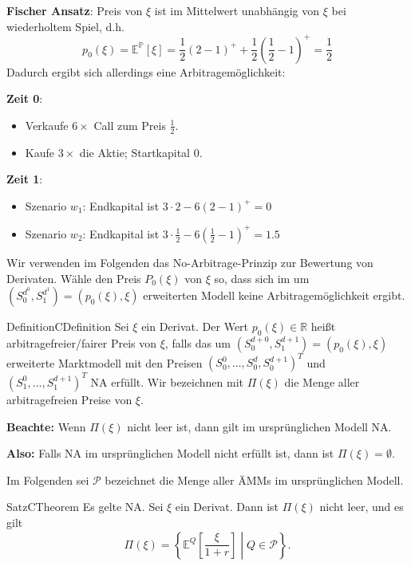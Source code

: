 \documentclass[11.5 pt, a4paper]{memoir}
\begin{document}
\textbf{Fischer Ansatz}: Preis von $\xi$ ist im Mittelwert unabhängig von $\xi$ bei wiederholtem Spiel, d.h.
\[
p_0(\xi) = \mathbb{E}^{ \mathbb{P} } \left[ \xi \right] = \frac{1}{2} \left(2 - 1\right)^+ + \frac{1}{2} \left(\frac{1}{2} - 1\right)^+ = \frac{1}{2}
\]
Dadurch ergibt sich allerdings eine Arbitragemöglichkeit:

\textbf{Zeit 0}:
\begin{itemize}
	\item Verkaufe $6 \times$ Call zum Preis $\frac{1}{2}$.
	\item Kaufe $3 \times$ die Aktie; Startkapital 0.
\end{itemize}
\textbf{Zeit 1}: 
\begin{itemize}
    \item Szenario $w_1$: Endkapital ist $3 \cdot 2 - 6 \left(2 - 1\right)^+ = 0$
    \item Szenario $w_2$: Endkapital ist $3 \cdot \frac{1}{2} - 6 \left(\frac{1}{2} - 1\right)^+ = 1.5$
\end{itemize}
Wir verwenden im Folgenden das No-Arbitrage-Prinzip zur Bewertung von Derivaten. Wähle den Preis $P_0(\xi)$ von $\xi$ so, dass sich im um $\left( S_0^{d^0}, S_1^{d^1} \right) = \left( p_0(\xi), \xi \right)$ erweiterten Modell keine Arbitragemöglichkeit ergibt.

\begin{ibox}[3.4]{Definition}{CDefinition}
Sei $\xi$ ein Derivat. Der Wert $p_0(\xi) \in \mathbb{R}$ heißt arbitragefreier/fairer Preis von $\xi$, falls das um 
$\left( S_0^{d+0}, S_1^{d+1} \right) = \left( p_0(\xi), \xi \right)$ erweiterte Marktmodell mit den Preisen 
$\left( S_0^0, \dots, S_0^d, S_0^{d+1} \right)^T$ und $\left( S_1^0, \dots, S_1^{d+1} \right)^T$ NA erfüllt.
Wir bezeichnen mit $\Pi(\xi)$ die Menge aller arbitragefreien Preise von $\xi$.
\end{ibox}
\textbf{Beachte:} Wenn $\Pi(\xi)$ nicht leer ist, dann gilt im ursprünglichen Modell NA.

\textbf{Also:} Falls NA im ursprünglichen Modell nicht erfüllt ist, dann ist $\Pi(\xi) = \emptyset$.

Im Folgenden sei $ \mathcal{P}$ bezeichnet die Menge aller ÄMMs im ursprünglichen Modell.

\begin{ibox}[3.5]{Satz}{CTheorem}
Es gelte NA. Sei $\xi$ ein Derivat. Dann ist $\Pi(\xi)$ nicht leer, und es gilt
\[
\Pi(\xi) = \left\{ \mathbb{E}^Q \left[ \frac{\xi}{1+r} \right] \middle| Q \in \mathcal{P} \right\}.
\]
\end{ibox}
\end{document}
